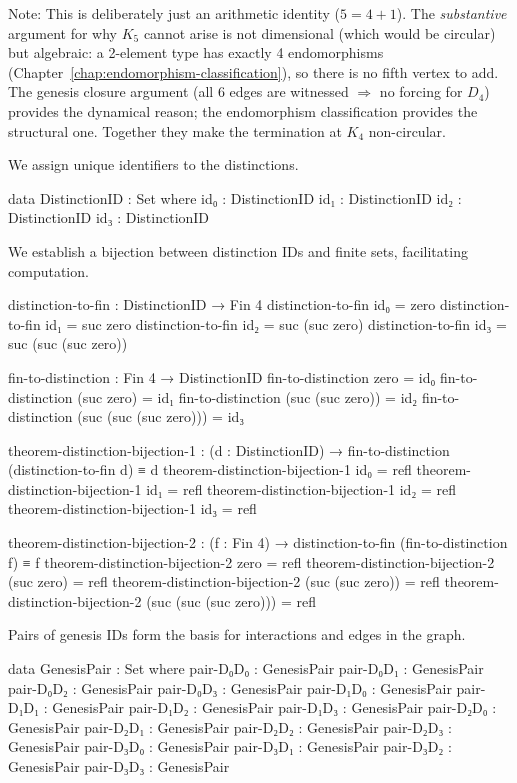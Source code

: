 \documentclass[11pt,a4paper]{book}
\begin{document}
\noindent Note: This is deliberately just an arithmetic identity ($5 = 4 + 1$).
The \emph{substantive} argument for why $K_5$ cannot arise is not dimensional
(which would be circular) but algebraic: a 2-element type has exactly 4
endomorphisms (Chapter~\ref{chap:endomorphism-classification}), so there is no
fifth vertex to add.  The genesis closure argument (all 6 edges are
witnessed $\Rightarrow$ no forcing for $D_4$) provides the dynamical reason;
the endomorphism classification provides the structural one.  Together they
make the termination at $K_4$ non-circular.

We assign unique identifiers to the distinctions.

\begin{code}
data DistinctionID : Set where
  id₀ : DistinctionID
  id₁ : DistinctionID
  id₂ : DistinctionID
  id₃ : DistinctionID

\end{code}

We establish a bijection between distinction IDs and finite sets, facilitating computation.

\begin{code}
distinction-to-fin : DistinctionID → Fin 4
distinction-to-fin id₀ = zero
distinction-to-fin id₁ = suc zero
distinction-to-fin id₂ = suc (suc zero)
distinction-to-fin id₃ = suc (suc (suc zero))

fin-to-distinction : Fin 4 → DistinctionID
fin-to-distinction zero = id₀
fin-to-distinction (suc zero) = id₁
fin-to-distinction (suc (suc zero)) = id₂
fin-to-distinction (suc (suc (suc zero))) = id₃

theorem-distinction-bijection-1 : (d : DistinctionID) → fin-to-distinction (distinction-to-fin d) ≡ d
theorem-distinction-bijection-1 id₀ = refl
theorem-distinction-bijection-1 id₁ = refl
theorem-distinction-bijection-1 id₂ = refl
theorem-distinction-bijection-1 id₃ = refl

theorem-distinction-bijection-2 : (f : Fin 4) → distinction-to-fin (fin-to-distinction f) ≡ f
theorem-distinction-bijection-2 zero = refl
theorem-distinction-bijection-2 (suc zero) = refl
theorem-distinction-bijection-2 (suc (suc zero)) = refl
theorem-distinction-bijection-2 (suc (suc (suc zero))) = refl
\end{code}

Pairs of genesis IDs form the basis for interactions and edges in the graph.

\begin{code}
data GenesisPair : Set where
  pair-D₀D₀ : GenesisPair
  pair-D₀D₁ : GenesisPair
  pair-D₀D₂ : GenesisPair
  pair-D₀D₃ : GenesisPair
  pair-D₁D₀ : GenesisPair
  pair-D₁D₁ : GenesisPair
  pair-D₁D₂ : GenesisPair
  pair-D₁D₃ : GenesisPair
  pair-D₂D₀ : GenesisPair
  pair-D₂D₁ : GenesisPair
  pair-D₂D₂ : GenesisPair
  pair-D₂D₃ : GenesisPair
  pair-D₃D₀ : GenesisPair
  pair-D₃D₁ : GenesisPair
  pair-D₃D₂ : GenesisPair
  pair-D₃D₃ : GenesisPair
\end{code}
\end{document}
